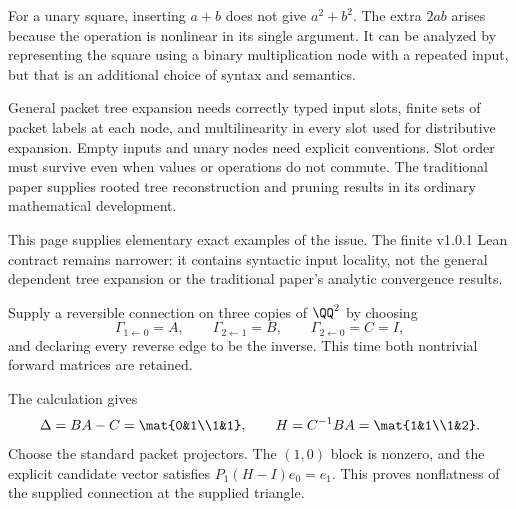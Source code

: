 
For a unary square, inserting $a+b$ does not give $a^2+b^2$. The extra $2ab$ arises because the operation is nonlinear in its single argument. It can be analyzed by representing the square using a binary multiplication node with a repeated input, but that is an additional choice of syntax and semantics.

General packet tree expansion needs correctly typed input slots, finite sets of packet labels at each node, and multilinearity in every slot used for distributive expansion. Empty inputs and unary nodes need explicit conventions. Slot order must survive even when values or operations do not commute. The traditional paper supplies rooted tree reconstruction and pruning results in its ordinary mathematical development.

This page supplies elementary exact examples of the issue. The finite v1.0.1 Lean contract remains narrower: it contains syntactic input locality, not the general dependent tree expansion or the traditional paper's analytic convergence results.


Supply a reversible connection on three copies of $\QQ^2$ by choosing
\[
\Gamma_{1\leftarrow0}=A,\qquad\Gamma_{2\leftarrow1}=B,
\qquad\Gamma_{2\leftarrow0}=C=I,
\]
and declaring every reverse edge to be the inverse. This time both nontrivial forward matrices are retained.


The calculation gives
\[
\Delta=BA-C=\mat{0&1\\1&1},\qquad H=C^{-1}BA=\mat{1&1\\1&2}.
\]
Choose the standard packet projectors. The $(1,0)$ block is nonzero, and the explicit candidate vector satisfies $P_1(H-I)e_0=e_1$. This proves nonflatness of the supplied connection at the supplied triangle.

